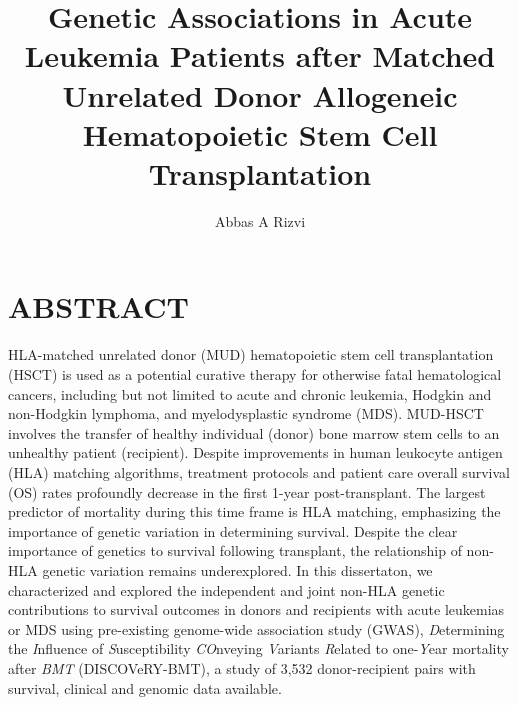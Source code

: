 \documentclass[]{DissertateOSU}
\title{Genetic Associations in Acute Leukemia Patients after Matched Unrelated
Donor Allogeneic Hematopoietic Stem Cell Transplantation}
\author{Abbas A Rizvi}
\date{}
\begin{document}
\maketitle

 \pagestyle{empty} \copyrightpage

\newpage

\pagestyle{plain} \fancyhead[L]{} \fancyhead[R]{}
\fancyfoot[C]{\thepage} \chapter*{ABSTRACT}

\doublespacing
HLA-matched unrelated donor (MUD) hematopoietic stem cell
transplantation (HSCT) is used as a potential curative therapy for
otherwise fatal hematological cancers, including but not limited to
acute and chronic leukemia, Hodgkin and non-Hodgkin lymphoma, and
myelodysplastic syndrome (MDS). MUD-HSCT involves the transfer of
healthy individual (donor) bone marrow stem cells to an unhealthy
patient (recipient). Despite improvements in human leukocyte antigen
(HLA) matching algorithms, treatment protocols and patient care overall
survival (OS) rates profoundly decrease in the first 1-year
post-transplant. The largest predictor of mortality during this time
frame is HLA matching, emphasizing the importance of genetic variation
in determining survival. Despite the clear importance of genetics to
survival following transplant, the relationship of non-HLA genetic
variation remains underexplored. In this dissertaton, we characterized
and explored the independent and joint non-HLA genetic contributions to
survival outcomes in donors and recipients with acute leukemias or MDS
using pre-existing genome-wide association study (GWAS),
\emph{D}etermining the \emph{I}nfluence of \emph{S}usceptibility
\emph{CO}nveying \emph{V}ariants \emph{R}elated to one-\emph{Y}ear
mortality after \emph{BMT} (DISCOVeRY-BMT), a study of 3,532
donor-recipient pairs with survival, clinical and genomic data
available.
\end{document}
